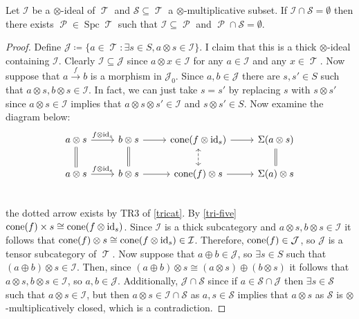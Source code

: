 \documentclass[11pt]{article}
\DeclareMathOperator{\TT}{\mathcal{T}}
\DeclareMathOperator{\cP}{\mathcal{P}}
\DeclareMathOperator{\spc}{Spc}
\begin{document}
\begin{lem}
Let $\mathcal{I}$ be a $\otimes$-ideal of $\TT$ and $\mathcal{S} \subseteq \TT$ a $\otimes$-multiplicative subset. If $\mathcal{I} \cap \mathcal{S} = \emptyset$ then there exists $\cP \in \spc \TT$ such that $\mathcal{I} \subseteq \cP$ and $\cP \cap \mathcal{S} = \emptyset$.
\end{lem}
\begin{proof}
Define $\mathcal{J} \coloneqq \{a \in \TT: \exists s \in S, a \otimes s \in \mathcal{I}\}$. I claim that this is a thick $\otimes$-ideal containing $\mathcal{I}$. Clearly $\mathcal{I} \subseteq \mathcal{J}$ since $a \otimes x \in \mathcal{I}$ for any $a \in \mathcal{I}$ and any $x \in \TT$. Now suppose that $a \xrightarrow{f} b$ is a morphism in $\mathcal{J}_0$. Since $a,b \in \mathcal{J}$ there are $s,s' \in S$ such that $a \otimes s, b \otimes s \in \mathcal{I}$. In fact, we can just take $s = s'$ by replacing $s$ with $s \otimes s'$ since $a \otimes s \in \mathcal{I}$ implies that $a \otimes s \otimes s' \in \mathcal{I}$ and $s \otimes s' \in S$. Now examine the diagram below:
\[\begin{tikzcd}
a \otimes s \ar[r,"f \otimes \id_s"] \ar[d,equal] & b \otimes s \ar[d,equal] \ar[r] & \cone(f \otimes \id_s) \ar[r] \ar[d,dashed,leftrightarrow] & \Sigma(a \otimes s) \ar[d, equal]\\
 a \otimes s \ar[r,"f \otimes \id_s"]& b \otimes s \ar[r] & \cone(f) \otimes s \ar[r] &  \Sigma(a) \otimes s \\
\end{tikzcd}\]
the dotted arrow exists by TR3 of \autoref{tricat}. By \autoref{tri-five} $\operatorname{cone}(f) \times s \cong \operatorname{cone}(f \otimes \operatorname{id}_s)$. Since $\mathcal{I}$ is a thick subcategory and $a \otimes s, b \otimes s \in \mathcal{I}$ it follows that $\operatorname{cone}(f) \otimes s \cong \operatorname{cone}(f \otimes \operatorname{id}_s) \in \mathcal{I}$. Therefore, $\operatorname{cone}(f) \in \mathcal{J}$, so $\mathcal{J}$ is a tensor subcategory of $\TT$. Now suppose that $a \oplus b \in \mathcal{J} $, so $\exists s \in S $ such that $(a \oplus b) \otimes s \in \mathcal{I}$. Then, since $(a \oplus b) \otimes s \cong (a \otimes s) \oplus (b \otimes s)$ it follows that $a \otimes s, b \otimes s \in \mathcal{I}$, so $a,b \in \mathcal{J}$. Additionally, $\mathcal{J} \cap \mathcal{S}$ since if $a \in \mathcal{S} \cap \mathcal{J}$ then $\exists s \in \mathcal{S}$ such that $a \otimes s \in \mathcal{I}$, but then $a \otimes s \in \mathcal{I} \cap \mathcal{S}$ as $a,s \in \mathcal{S}$ implies that $a \otimes s$ as $\mathcal{S}$ is $\otimes$-multiplicatively closed, which is a contradiction.


\end{proof}
\end{document}
